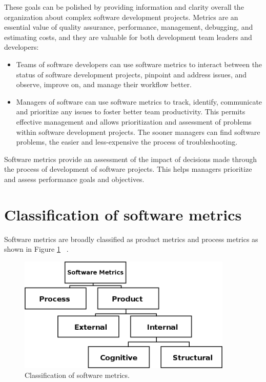 These goals can be polished by providing information and clarity overall the organization about complex software development projects. Metrics are an essential value of quality assurance, performance, management, debugging, and estimating costs, and they are valuable for both development team leaders and developers:

\begin{itemize}
	\item Teams of software developers can use software metrics to interact between the status of
	software development projects, pinpoint and address issues, and observe, improve on,
	and manage their workflow better.
	\item Managers of software can use software metrics to track, identify, communicate and prioritize any
	issues to foster better team productivity. This permits effective management and allows
	prioritization and assessment of problems within software development projects. The
	sooner managers can find software problems, the easier and less-expensive the process of troubleshooting.
\end{itemize}

Software metrics provide an assessment of the impact of decisions made through the process of development of software projects. This helps managers prioritize and assess performance goals and objectives.

\section{Classification of software metrics}

Software metrics are broadly classified as product metrics and process metrics as shown in Figure \ref{fig:classification} ~\cite{metrics2}.
\begin{figure}[h]
	\centering
	\includegraphics[height=55mm]{figures/classification.png}
	\caption{Classification of software metrics.}
	\label{fig:classification}
\end{figure}

